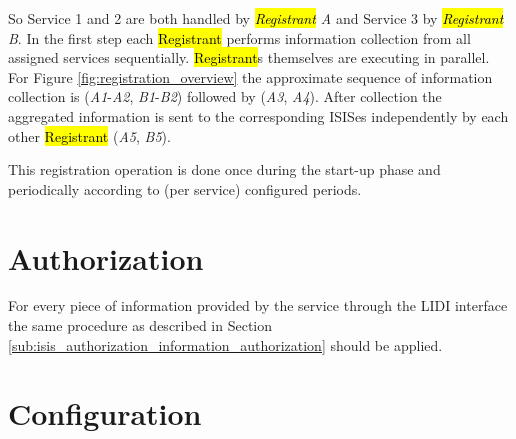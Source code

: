\documentclass{book}
\begin{document}
So Service 1 and 2 are both handled by \textit{\hl{Registrant} A} and Service 3 by \textit{\hl{Registrant} B}.
In the first step each \hl{Registrant} performs information collection from all assigned services sequentially. \hl{Registrant}s themselves are executing in parallel. For Figure \ref{fig:registration_overview} the approximate sequence of information collection is (\textit{A1}-\textit{A2}, \textit{B1}-\textit{B2}) followed by (\textit{A3}, \textit{A4}). After collection  the aggregated information is sent to the corresponding ISISes independently by each other \hl{Registrant} (\textit{A5}, \textit{B5}).

\begin{figure}[ht]
\end{figure}

This registration operation is done once during the start-up phase and periodically according to 
(per service) configured periods.



\section{Authorization}
\label{sec:service_authorization}

For every piece of information provided by the service through the LIDI interface the same procedure as described in 
Section \ref{sub:isis_authorization_information_authorization} should be applied.



\section{Configuration}
\label{sec:service_configuration}
\end{document}
